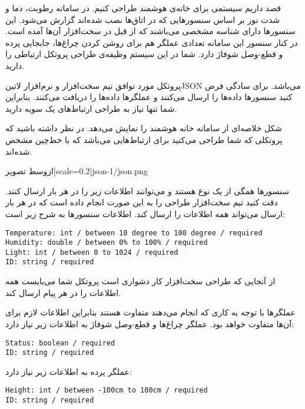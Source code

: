 
قصد داریم سیستمی برای خانه‌ی هوشمند طراحی کنیم.
در سامانه رطوبت، دما و شدت نور بر اساس سنسورهایی که در اتاق‌ها نصب شده‌اند گزارش می‌شود.
این سنسورها دارای شناسه مشخصی می‌باشند که از قبل در سخت‌افزار آن‌ها آمده است.
در کنار سنسور این سامانه تعدادی عملگر هم برای روشن کردن چراغ‌ها، جابجایی پرده و قطع-وصل شوفاژ دارد.
شما در این سیستم وظیفه‌ی طراحی پروتکل ارتباطی را دارید.

پروتکل مورد توافق تیم سخت‌افزار و نرم‌افزار ‌لاتین{JSON} می‌باشد. برای سادگی فرض کنید سنسورها داده‌ها را ارسال می‌کنند و عملگرها داده‌ها را دریافت می‌کنند.
بنابراین شما تنها نیاز به طراحی ارتباط‌های یک سویه دارید.

شکل  خلاصه‌ای از سامانه خانه هوشمند را نمایش می‌دهد. در نظر داشته باشید که پروتکلی که
شما طراحی می‌کنید برای ارتباط‌هایی می‌باشد که با خط‌چین مشخص شده‌اند.

  ‌ازوسط
  ‌تصویر[scale=0.2]{json-1/json.png}

سنسورها همگی از یک نوع هستند و می‌توانند اطلاعات زیر را در هر بار ارسال کنند.
دقت کنید تیم سخت‌افزار طراحی را به این صورت انجام داده است که در هر بار ارسال می‌تواند همه اطلاعات را ارسال کند.
اطلاعات سنسورها به شرح زیر است:

\begin{latin}
\begin{verbatim}
Temperature: int / between 10 degree to 100 degree / required
Humidity: double / between 0% to 100% / required
Light: int / between 0 to 1024 / required
ID: string / required
\end{verbatim}
\end{latin}

از آنجایی که طراحی سخت‌افزار کار دشواری است پروتکل شما می‌بایست همه اطلاعات را در هر پیام ارسال کند.

عملگرها با توجه به کاری که انجام می‌دهند متفاوت هستند بنابراین اطلاعات لازم برای آن‌ها متفاوت خواهد بود.
عملگر چراغ‌ها و قطع-وصل شوفاژ به اطلاعات زیر نیاز دارد:

\begin{latin}
\begin{verbatim}
Status: boolean / required
ID: string / required
\end{verbatim}
\end{latin}

عملگر پرده به اطلاعات زیر نیاز دارد:

\begin{latin}
\begin{verbatim}
Height: int / between -100cm to 100cm / required
ID: string / required
\end{verbatim}
\end{latin}

